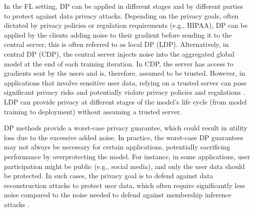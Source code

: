 In the FL setting, DP can be applied in different stages and by different parties to protect against data privacy attacks.
%
Depending on the privacy goals, often dictated by privacy policies or regulation requirements (e.g., HIPAA), DP can be applied by the clients adding noise to their gradient before sending it to the central server; this is often referred to as local DP (LDP). Alternatively, in central DP (CDP), the central server injects noise into the aggregated global model at the end of each training iteration. 
%
In CDP, the server has access to gradients sent by the users and is, therefore, assumed to be trusted.
 However, in applications that involve sensitive user data, relying on a trusted server can pose significant privacy risks and potentially violate privacy policies and regulations \cite{groce2011limits}.
%
 LDP can provide privacy at different stages of the model's life cycle (from model training to deployment) without assuming a trusted server. 

DP methods provide a worst-case privacy guarantee, which could result in utility loss due to the excessive added noise.  
%
%
In practice, the worst-case DP guarantees may not always be necessary for certain applications, potentially sacrificing performance by overprotecting the model.
%
For instance, in some applications, user participation might be public (e.g., social media), and only the user data should be protected. 
%
In such cases, the privacy goal is to defend against data reconstruction attacks to protect user data, which often require significantly less noise compared to the noise needed to defend against membership inference attacks \cite{balle2022reconstructing}.  
%

